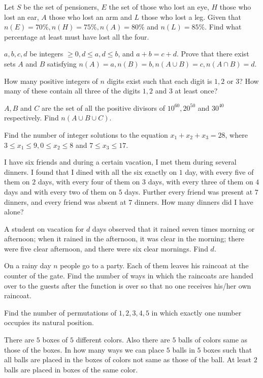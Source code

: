   Let $S$ be the set of pensioners, $E$ the set of those who lost an eye, $H$ those who lost an ear, $A$
  those who lost an arm and $L$ those who lost a leg. Given that $n(E) = 70\%, n(H ) = 75\%, n(A) = 80\%$
  and $n(L) = 85\%$. Find what percentage at least must have lost all the four.
\item $a, b, c, d$ be integers $\geq 0, d \leq a, d \leq b$, and $a + b = c + d$. Prove that there exist
  sets $A$ and $B$ satisfying $n(A) = a, n(B) = b, n(A \cup B) = c, n(A \cap B) = d$.
\item How many positive integers of $n$ digits exist such that each digit is $1, 2$ or $3$? How many of
  these contain all three of the digits $1, 2$ and $3$ at least once?
\item $A, B$ and $C$ are the set of all the positive divisors of $10^{60}, 20^{50}$ and $30^{40}$
  respectively. Find $n(A\cup B\cup C)$.
\item Find the number of integer solutions to the equation $x_1 + x_2 + x_3 = 28$, where $3 \leq x_1 \leq 9,
  0 \leq x_2 \leq 8$ and $7 \leq x_3 \leq 17$.
\item I have six friends and during a certain vacation, I met them during several dinners. I found that I
  dined with all the six exactly on $1$ day, with every five of them on $2$ days, with every four of them on
  $3$ days, with every three of them on $4$ days and with every two of them on $5$ days. Further every
  friend was present at $7$ dinners, and every friend was absent at $7$ dinners. How many dinners did I have
  alone?
\item A student on vacation for $d$ days observed that it rained seven times morning or afternoon; when it
  rained in the afternoon, it was clear in the morning; there were five clear afternoon, and there were six
  clear mornings. Find $d$.
\item On a rainy day $n$ people go to a party. Each of them leaves his raincoat at the counter of the
  gate. Find the number of ways in which the raincoats are handed over to the guests after the function is
  over so that no one receives his/her own raincoat.
\item Find the number of permutations of $1, 2, 3, 4, 5$ in which exactly one number occupies its natural
  position.
\item There are $5$ boxes of $5$ different colors. Also there are $5$ balls of colors same as those of the
  boxes. In how many ways we can place $5$ balls in $5$ boxes such that all balls are placed in the boxes of
  colors not same as those of the ball. At least $2$ balls are placed in boxes of the same color.
